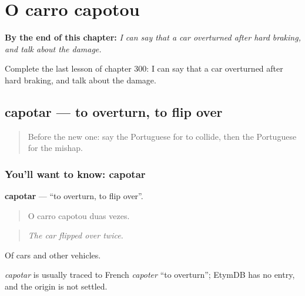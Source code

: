
\chapter{O carro capotou}
\label{ch:pt-o-carro-capotou}

\begin{chapteropening}
\textbf{By the end of this chapter:} \emph{I can say that a car overturned after hard braking, and talk about the damage.}

Complete the last lesson of chapter 300: I can say that a car overturned after hard braking, and talk about the damage.
\end{chapteropening}

\section[capotar]{capotar — to overturn, to flip over}

\label{lesson:PT-C300-capotar}



\begin{quote}
Before the new one: say the Portuguese for to collide, then the Portuguese for the mishap.
\end{quote}

\subsection*{You'll want to know: capotar}
\textbf{capotar} — \textquotedblleft{}to overturn, to flip over\textquotedblright{}.

\begin{quote}
O carro capotou duas vezes.
\end{quote}

\begin{quote}
\emph{The car flipped over twice.}
\end{quote}

Of cars and other vehicles.

\begin{cousinweb}
\emph{capotar} is usually traced to French \emph{capoter} \textquotedblleft{}to overturn\textquotedblright{}; EtymDB has no entry, and the origin is not settled.
\end{cousinweb}

